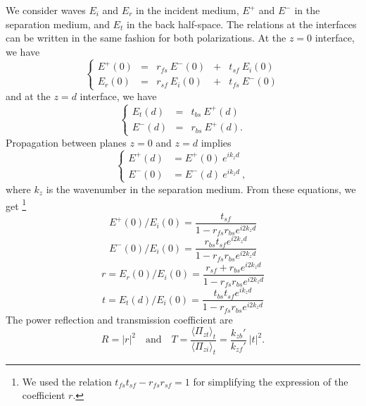 We consider waves $E_i$ and $E_r$ in the incident medium, $E^+$ and $E^-$ in the separation medium, and $E_t$ in the back half-space.
The relations at the interfaces can be written in the same fashion for both polarizations. 
At the $z=0$ interface, we have
\begin{equation*}
\left\{
\begin{array}{lllll}\label{eq:continuity0}
E^+(0)  & = & r_{fs}\ E^-(0)  & + & t_{sf}\ E_i(0)    \\
E_r(0)  & = & r_{sf}\ E_i(0)  & + & t_{fs}\ E^-(0)
\end{array}\right.
\end{equation*}
and at the $z=d$ interface, we have
\begin{equation*}
\left\{
\begin{array}{lll}\label{eq:continuityd}
E_t(d)  & = & t_{bs}\ E^+(d)  \\
E^-(d)  & = & r_{bs}\ E^+(d).
\end{array}\right.
\end{equation*}
Propagation between planes $z=0$ and $z=d$ implies
\begin{equation*}
\left\{
\begin{array}{lll}\label{eq:0tod}
E^+(d) & = E^+(0)\ e^{ik_z d}\\
E^-(0) & = E^-(d)\ e^{ik_z d} \ ,
\end{array}\right.
\end{equation*}
where $k_z$ is the wavenumber in the separation medium.
From these equations, we get%
\footnote{We used the relation $t_{fs} t_{sf} - r_{fs} r_{sf} = 1$ for simplifying the expression of the coefficient $r$.}
\begin{equation*}
E^+(0) / E_i(0) =\frac{t_{sf}}{1 - r_{fs}r_{bs}e^{i2k_z d}}
\end{equation*}
%
\begin{equation*}
E^-(0) / E_i(0) =\frac{r_{bs} t_{sf} e^{i2k_z d}}{1-r_{fs}r_{bs}e^{i2k_z d}}
\end{equation*}
%
\begin{equation*}\label{eq:reflectivewave}
r = E_r(0) / E_i(0) =
\frac{r_{sf} + r_{bs} e^{i2k_z d}}{1-r_{fs}r_{bs}e^{i2k_z d}}
\end{equation*}
%
\begin{equation*}\label{eq:transmittedwave}
t = E_t(d) / E_i(0) =
\frac{t_{bs} t_{sf} e^{ik_z d}}{1 - r_{fs}r_{bs}e^{i2k_z d}}
\end{equation*}
The power reflection and transmission coefficient are
$$
R = |r|^2 
\quad\textrm{and}\quad
T = \frac{\langle \Pi_{zt} \rangle_t}{\langle \Pi_{zi} \rangle_t} 
= \frac{k_{zb}'}{k_{zf}'} \ |t|^2
.
$$
